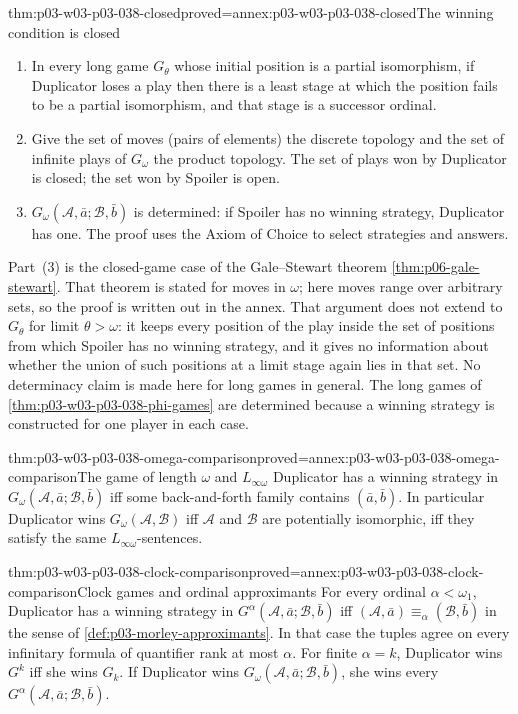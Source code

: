 \begin{hblemma}{thm:p03-w03-p03-038-closed}{proved=annex:p03-w03-p03-038-closed}{The winning condition is closed}
\begin{enumerate}
\item In every long game \(G_\theta\) whose initial position is a partial
      isomorphism, if Duplicator loses a play then there is a least stage
      at which the position fails to be a partial isomorphism, and that
      stage is a successor ordinal.
\item Give the set of moves (pairs of elements) the discrete topology and
      the set of infinite plays of \(G_\omega\) the product topology. The
      set of plays won by Duplicator is closed; the set won by Spoiler is
      open.
\item \(G_\omega(\mathcal A,\bar a;\mathcal B,\bar b)\) is determined: if
      Spoiler has no winning strategy, Duplicator has one. The proof uses
      the Axiom of Choice to select strategies and answers.
\end{enumerate}
\end{hblemma}

Part~(3) is the closed-game case of the Gale--Stewart theorem
\cref{thm:p06-gale-stewart}. That theorem is stated for moves in \(\omega\);
here moves range over arbitrary sets, so the proof is written out in the
annex. That argument does not extend to \(G_\theta\) for limit
\(\theta>\omega\): it keeps every position of the play inside the set of
positions from which Spoiler has no winning strategy, and it gives no
information about whether the union of such positions at a limit stage
again lies in that set. No
determinacy claim is made here for long games in general. The long games of
\cref{thm:p03-w03-p03-038-phi-games} are determined because a winning
strategy is constructed for one player in each case.

\begin{hbtheorem}{thm:p03-w03-p03-038-omega-comparison}{proved=annex:p03-w03-p03-038-omega-comparison}{The game of length \(\omega\) and \(L_{\infty\omega}\)}
Duplicator has a winning strategy in
\(G_\omega(\mathcal A,\bar a;\mathcal B,\bar b)\) iff some back-and-forth
family contains \((\bar a,\bar b)\). In particular Duplicator wins
\(G_\omega(\mathcal A,\mathcal B)\) iff \(\mathcal A\) and \(\mathcal B\)
are potentially isomorphic, iff they satisfy the same
\(L_{\infty\omega}\)-sentences.
\end{hbtheorem}

\begin{hbtheorem}{thm:p03-w03-p03-038-clock-comparison}{proved=annex:p03-w03-p03-038-clock-comparison}{Clock games and ordinal approximants}
For every ordinal \(\alpha<\omega_1\), Duplicator has a winning strategy in
\(G^\alpha(\mathcal A,\bar a;\mathcal B,\bar b)\) iff
\((\mathcal A,\bar a)\equiv_\alpha(\mathcal B,\bar b)\) in the sense of
\cref{def:p03-morley-approximants}. In that case the tuples agree on every
infinitary formula of quantifier rank at most \(\alpha\). For finite
\(\alpha=k\), Duplicator wins \(G^k\) iff she wins \(G_k\). If Duplicator
wins \(G_\omega(\mathcal A,\bar a;\mathcal B,\bar b)\), she wins every
\(G^\alpha(\mathcal A,\bar a;\mathcal B,\bar b)\).
\end{hbtheorem}

